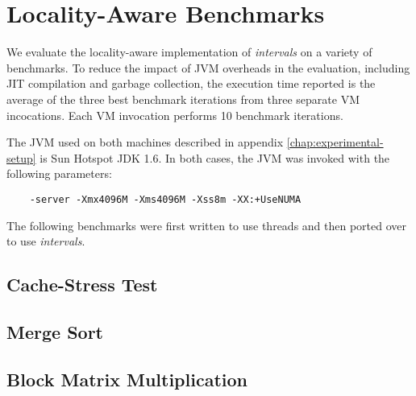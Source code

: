 
\section{Locality-Aware Benchmarks}

We evaluate the locality-aware implementation of \emph{intervals} on a
variety of benchmarks. To reduce the impact of JVM overheads in the
evaluation, including JIT compilation and garbage collection, the
execution time reported is the average of the three best benchmark
iterations from three separate VM incocations. Each VM invocation
performs 10 benchmark iterations.

The JVM used on both machines described in appendix
\ref{chap:experimental-setup} is Sun Hotspot JDK 1.6. In both cases,
the JVM was invoked with the following parameters:

\begin{verbatim}
    -server -Xmx4096M -Xms4096M -Xss8m -XX:+UseNUMA
\end{verbatim}

The following benchmarks were first written to use threads and then
ported over to use \emph{intervals}.

\subsection*{Cache-Stress Test}


\subsection*{Merge Sort}


\subsection*{Block Matrix Multiplication}



